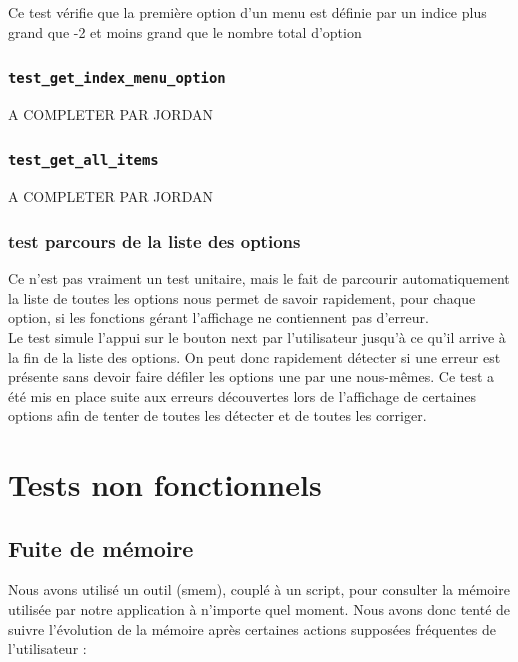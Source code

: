 \documentclass[16pts]{report}
\begin{document}
Ce test vérifie que la première option d'un menu est définie par un indice
plus grand que -2 et moins grand que le nombre total d'option\\

\subsubsection{\texttt{test\_get\_index\_menu\_option}}

A COMPLETER PAR JORDAN

\subsubsection{\texttt{test\_get\_all\_items}}

A COMPLETER PAR JORDAN

\subsubsection{test parcours de la liste des options}

Ce n'est pas vraiment un test unitaire, mais le fait de parcourir 
automatiquement la liste de toutes les options nous permet de savoir rapidement,
pour chaque option, si les fonctions gérant l'affichage ne contiennent pas 
d'erreur.\\
Le test simule l'appui sur le bouton next par l'utilisateur jusqu'à ce qu'il
arrive à la fin de la liste des options. On peut donc rapidement détecter si 
une erreur est présente sans devoir faire défiler les options une par une nous-mêmes. Ce test a été mis en place suite aux erreurs découvertes lors de
l'affichage de certaines options afin de tenter de toutes les détecter et de 
toutes les corriger.\\


    \section{Tests non fonctionnels}
    \label{sec:Tests non fonctionnels}

\subsection{Fuite de mémoire}

Nous avons utilisé un outil (smem), couplé à un script, pour consulter la 
mémoire utilisée par notre application à n'importe quel moment. Nous avons 
donc tenté de suivre l'évolution de la mémoire après certaines actions supposées
fréquentes de l'utilisateur : \\
\end{document}
